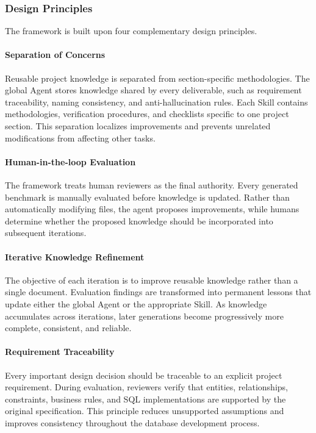 \subsubsection{Design Principles}

The framework is built upon four complementary design principles.

\paragraph{Separation of Concerns}

Reusable project knowledge is separated from section-specific methodologies. The global Agent stores knowledge shared by every deliverable, such as requirement traceability, naming consistency, and anti-hallucination rules. Each Skill contains methodologies, verification procedures, and checklists specific to one project section. This separation localizes improvements and prevents unrelated modifications from affecting other tasks.

\paragraph{Human-in-the-loop Evaluation}

The framework treats human reviewers as the final authority. Every generated benchmark is manually evaluated before knowledge is updated. Rather than automatically modifying files, the agent proposes improvements, while humans determine whether the proposed knowledge should be incorporated into subsequent iterations.

\paragraph{Iterative Knowledge Refinement}

The objective of each iteration is to improve reusable knowledge rather than a single document. Evaluation findings are transformed into permanent lessons that update either the global Agent or the appropriate Skill. As knowledge accumulates across iterations, later generations become progressively more complete, consistent, and reliable.

\paragraph{Requirement Traceability}

Every important design decision should be traceable to an explicit project requirement. During evaluation, reviewers verify that entities, relationships, constraints, business rules, and SQL implementations are supported by the original specification. This principle reduces unsupported assumptions and improves consistency throughout the database development process.

